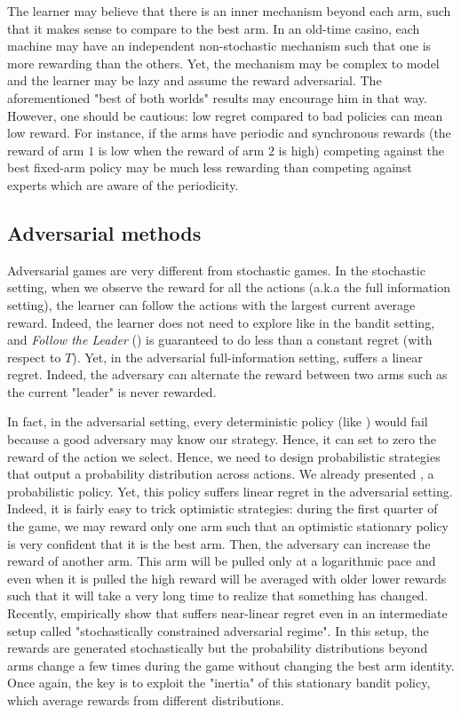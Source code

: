{The learner may believe that there is an inner mechanism beyond each arm, such that it makes sense to compare to the best arm. In an old-time casino, each machine may have an independent non-stochastic mechanism such that one is more rewarding than the others. Yet, the mechanism may be complex to model and the learner may be lazy and assume the reward adversarial. The aforementioned "best of both worlds" results may encourage him in that way. However, one should be cautious: low regret compared to bad policies can mean low reward. For instance, if the arms have periodic and synchronous rewards (the reward of arm $1$ is low when the reward of arm $2$ is high) competing against the best fixed-arm policy may be much less rewarding than competing against experts which are aware of the periodicity.


\subsection{Adversarial methods}

Adversarial games are very different from stochastic games. In the stochastic setting, when we observe the reward for all the actions (a.k.a the full information setting), the learner can follow the actions with the largest current average reward. Indeed, the learner does not need to explore like in the bandit setting, and \emph{Follow the Leader} (\FTL) is guaranteed to do less than a constant regret (with respect to $T$). Yet, in the adversarial full-information setting, \FTL suffers a linear regret. Indeed, the adversary can alternate the reward between two arms such as the current "leader" is never rewarded. 

In fact, in the adversarial setting, every deterministic policy (like \UCB) would fail because a good adversary may know our strategy. Hence, it can set to zero the reward of the action we select. Hence, we need to design probabilistic strategies that output a probability distribution across actions. We already presented \TS, a probabilistic policy. Yet, this policy suffers linear regret in the adversarial setting. Indeed, it is fairly easy to trick optimistic strategies: during the first quarter of the game, we may reward only one arm such that an optimistic stationary policy is very confident that it is the best arm. Then, the adversary can increase the reward of another arm. This arm will be pulled only at a logarithmic pace and even when it is pulled the high reward will be averaged with older lower rewards such that it will take a very long time to realize that something has changed. Recently, \citet{zimmert2018tsallis} empirically show that \TS suffers near-linear regret even in an intermediate setup called "stochastically constrained adversarial regime". In this setup, the rewards are generated stochastically but the probability distributions beyond arms change a few times during the game without changing the best arm identity. Once again, the key is to exploit the "inertia" of this stationary bandit policy, which average rewards from different distributions.

}
